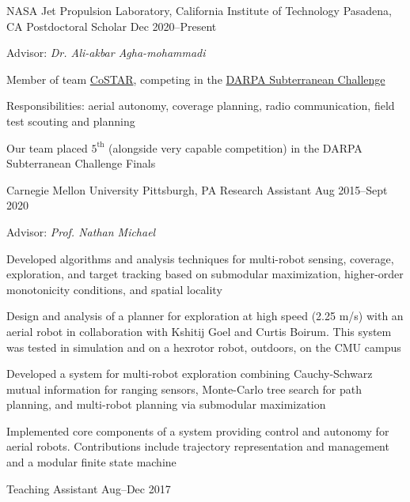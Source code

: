 
\begin{cventries}
  \cventry
  {NASA Jet Propulsion Laboratory, California Institute of Technology}
  {Pasadena, CA}
  {Postdoctoral Scholar}
  {Dec 2020--Present}
  {
    \begin{cvitems}
    \item Advisor: \emph{Dr. Ali-akbar Agha-mohammadi}
    \item Member of team \href{https://costar.jpl.nasa.gov/}{CoSTAR}, competing in the
      \href{https://www.subtchallenge.com/}{DARPA Subterranean Challenge}
    \item Responsibilities:
      aerial autonomy, coverage planning, radio communication,
      field test scouting and planning
    \item Our team placed $5^\mathrm{th}$ (alongside very capable competition)
      in the DARPA Subterranean Challenge Finals
    \end{cvitems}
  }
  \cventrytwo
  {Carnegie Mellon University}
  {Pittsburgh, PA}
  {Research Assistant}
  {Aug 2015--Sept 2020}
  {
    \begin{cvitems} %
    \item Advisor: \emph{Prof. Nathan Michael}
    \item Developed algorithms and analysis techniques for multi-robot sensing,
      coverage, exploration, and target tracking based on submodular
      maximization, higher-order monotonicity conditions, and spatial locality
    \item Design and analysis of a planner for exploration at high speed (2.25
      m/s) with an aerial robot in collaboration with Kshitij Goel and Curtis
      Boirum.
      This system was tested in simulation and on a hexrotor robot, outdoors, on
      the CMU campus
    \item Developed a system for multi-robot exploration combining Cauchy-Schwarz
      mutual information for ranging sensors, Monte-Carlo tree search for path
      planning, and multi-robot planning via submodular maximization
    \item Implemented core components of a system providing control and autonomy
      for aerial robots.
      Contributions include trajectory representation and management and a
      modular finite state machine
    \end{cvitems}
  }
  {Teaching Assistant}
  {Aug--Dec 2017}
  {
    \begin{cvitems} %

\end{cvitems}}
\end{cventries}
